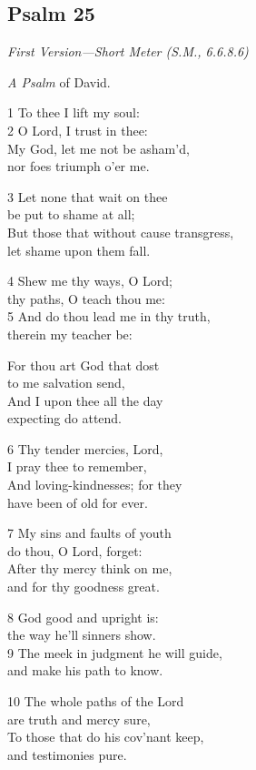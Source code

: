 \subsection*{Psalm 25 }

\emph{First Version---Short Meter (S.M., 6.6.8.6)}

\emph{A Psalm} of David.

1 To thee I lift my soul:\\
2 O Lord, I trust in thee:\\
My God, let me not be asham’d,\\
nor foes triumph o’er me.

3 Let none that wait on thee\\
be put to shame at all;\\
But those that without cause transgress,\\
let shame upon them fall.

4 Shew me thy ways, O Lord;\\
thy paths, O teach thou me:\\
5 And do thou lead me in thy truth,\\
therein my teacher be:

For thou art God that dost\\
to me salvation send,\\
And I upon thee all the day\\
expecting do attend.

6 Thy tender mercies, Lord,\\
I pray thee to remember,\\
And loving-kindnesses; for they\\
have been of old for ever.

7 My sins and faults of youth\\
do thou, O Lord, forget:\\
After thy mercy think on me,\\
and for thy goodness great.

8 God good and upright is:\\
the way he’ll sinners show.\\
9 The meek in judgment he will guide,\\
and make his path to know.

10 The whole paths of the Lord\\
are truth and mercy sure,\\
To those that do his cov’nant keep,\\
and testimonies pure.

